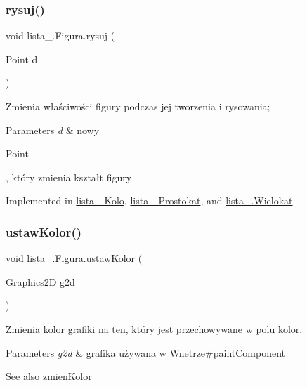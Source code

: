 \subsubsection{\texorpdfstring{rysuj()}{rysuj()}}
{\footnotesize\ttfamily void lista\+\_.\+Figura.\+rysuj (\begin{DoxyParamCaption}\item[{Point}]{d }\end{DoxyParamCaption})}

Zmienia właściwości figury podczas jej tworzenia i rysowania; 
\begin{DoxyParams}{Parameters}
{\em d} & nowy
\begin{DoxyCode}
Point 
\end{DoxyCode}
 , który zmienia kształt figury \\
\hline
\end{DoxyParams}


Implemented in \mbox{\hyperlink{classlista__5_1_1_kolo_acf743c21951288b8794d613665048610}{lista\+\_.\+Kolo}}, \mbox{\hyperlink{classlista__5_1_1_prostokat_a63b2bb7a2b3fd86e21d0d125f4262f39}{lista\+\_.\+Prostokat}}, and \mbox{\hyperlink{classlista__5_1_1_wielokat_aca4b29bcec579f442ac566ec3be96d84}{lista\+\_.\+Wielokat}}.

\mbox{\label{interfacelista__5_1_1_figura_a3cc13bf7229b288d743be7903b3b61a4}} 
\subsubsection{\texorpdfstring{ustaw\+Kolor()}{ustawKolor()}}
{\footnotesize\ttfamily void lista\+\_.\+Figura.\+ustaw\+Kolor (\begin{DoxyParamCaption}\item[{Graphics2D}]{g2d }\end{DoxyParamCaption})}

Zmienia kolor grafiki na ten, który jest przechowywane w polu kolor. 
\begin{DoxyParams}{Parameters}
{\em g2d} & grafika używana w \mbox{\hyperlink{classlista__5_1_1_wnetrze_aa8676192e150a17230d72de122744a47}{Wnetrze\#paint\+Component}} \\
\hline
\end{DoxyParams}
\begin{DoxySeeAlso}{See also}
\mbox{\hyperlink{interfacelista__5_1_1_figura_aeb0982dc44348dd1fde9266d9d476ed0}{zmien\+Kolor}} 
\end{DoxySeeAlso}



